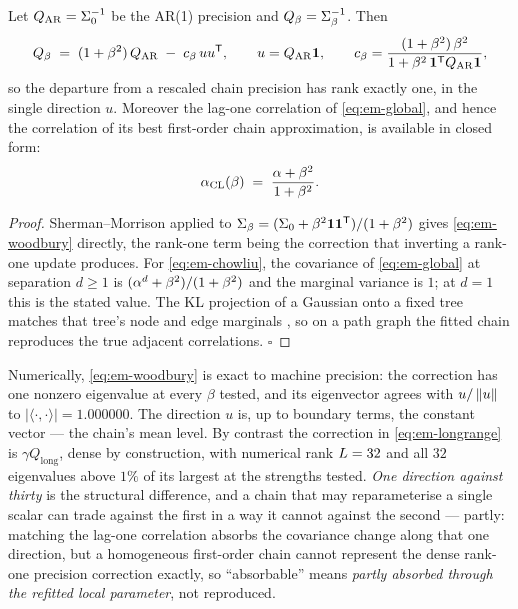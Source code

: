 \begin{proposition}
\label{prop:em-rankone}
Let $Q_{\mathrm{AR}} = \Sigma_0^{-1}$ be the AR(1) precision and
$Q_\beta = \Sigma_\beta^{-1}$. Then
\begin{equation}
  Q_\beta \;=\; (1+\beta^2)\,Q_{\mathrm{AR}} \;-\; c_\beta\, u u^{\mathsf{T}},
  \qquad
  u = Q_{\mathrm{AR}}\mathbf{1},
  \qquad
  c_\beta = \frac{(1+\beta^2)\,\beta^2}{1 + \beta^2\,\mathbf{1}^{\mathsf{T}}Q_{\mathrm{AR}}\mathbf{1}},
  \label{eq:em-woodbury}
\end{equation}
so the departure from a rescaled chain precision has rank exactly one, in the
single direction $u$. Moreover the lag-one correlation of \eqref{eq:em-global},
and hence the correlation of its best first-order chain approximation, is
available in closed form:
\begin{equation}
  \alpha_{\mathrm{CL}}(\beta) \;=\; \frac{\alpha + \beta^2}{1+\beta^2}.
  \label{eq:em-chowliu}
\end{equation}
\end{proposition}

\begin{proof}
Sherman--Morrison applied to
$\Sigma_\beta = (\Sigma_0 + \beta^2\mathbf{1}\mathbf{1}^{\mathsf{T}})/(1+\beta^2)$ gives
\eqref{eq:em-woodbury} directly, the rank-one term being the correction that
inverting a rank-one update produces. For \eqref{eq:em-chowliu}, the covariance
of \eqref{eq:em-global} at separation $d \geq 1$ is
$(\alpha^{d} + \beta^2)/(1+\beta^2)$ and the marginal variance is $1$; at
$d = 1$ this is the stated value. The KL projection of a Gaussian onto a fixed
tree matches that tree's node and edge marginals
\citep{chow1968approximating}, so on a path graph the fitted chain reproduces
the true adjacent correlations. \hfill$\square$
\end{proof}

\noindent Numerically, \eqref{eq:em-woodbury} is exact to machine precision: the
correction has one nonzero eigenvalue at every $\beta$ tested, and its
eigenvector agrees with $u/\left\lVert u \right\rVert$ to $|\langle\cdot,\cdot\rangle| = 1.000000$.
The direction $u$ is, up to boundary terms, the constant vector --- the chain's
mean level. By contrast the correction in \eqref{eq:em-longrange} is
$\gamma Q_{\mathrm{long}}$, dense by construction, with numerical rank
$L = 32$ and all $32$ eigenvalues above $1\%$ of its largest at the
strengths tested. \emph{One direction against thirty} is the structural
difference, and a chain that may reparameterise a single scalar can trade
against the first in a way it cannot against the second --- partly: matching
the lag-one correlation absorbs the covariance change along that one
direction, but a homogeneous first-order chain cannot represent the dense
rank-one precision correction exactly, so ``absorbable'' means \emph{partly
absorbed through the refitted local parameter}, not reproduced.

